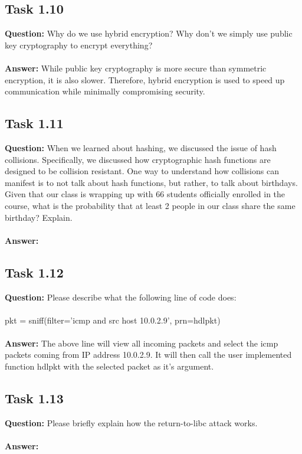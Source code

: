 \documentclass[11pt]{article}
\begin{document}
\subsection*{Task 1.10}

\textbf{Question: } Why do we use hybrid encryption? Why don’t we simply use public key cryptography to encrypt everything? \\\\
\textbf{Answer: } While public key cryptography is more secure than symmetric encryption, it is also slower. Therefore, hybrid encryption is used to speed up communication while minimally compromising security.

\subsection*{Task 1.11}

\textbf{Question: } When we learned about hashing, we discussed the issue of hash collisions. Specifically, we discussed how cryptographic hash functions are designed to be collision resistant. One way to understand how collisions can manifest is to not talk about hash functions, but rather, to talk about birthdays. Given that our class is wrapping up with 66 students officially enrolled in the course, what is the probability that at least 2 people in our class share the same birthday? Explain. \\\\
\textbf{Answer: }

\subsection*{Task 1.12}

\textbf{Question: } Please describe what the following line of code does: \\\\
\indent pkt = sniff(filter='icmp and src host 10.0.2.9', prn=hdlpkt) \\\\
\textbf{Answer: } The above line will view all incoming packets and select the icmp packets coming from IP address 10.0.2.9. It will then call the user implemented function hdlpkt with the selected packet as it's argument.

\subsection*{Task 1.13}

\textbf{Question: } Please briefly explain how the return-to-libc attack works. \\\\
\textbf{Answer: }
\end{document}
